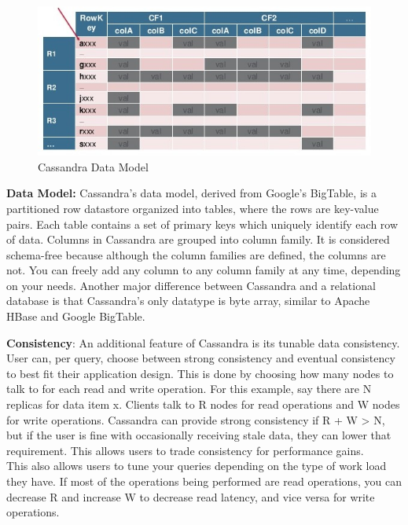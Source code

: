 \documentclass[9pt]{extarticle} %
\begin{document}
\begin{minipage}[t]{.61\linewidth}
\begin{figure}
\includegraphics[width=\linewidth]{imgs/data_model.jpg} 
\caption{Cassandra Data Model}\label{fig:2}
\end{figure} 

\textbf{Data Model:} Cassandra’s data model, derived from Google’s BigTable, is a partitioned row datastore organized into tables, where the rows are key-value pairs. Each table contains a set of primary keys which uniquely identify each row of data. Columns in Cassandra are grouped into column family. It is considered schema-free because although the column families are defined, the columns are not. You can freely add any column to any column family at any time, depending on your needs. Another major difference between Cassandra and a relational database is that Cassandra's only datatype is byte array, similar to Apache HBase and Google BigTable. 

\textbf{Consistency}: An additional feature of Cassandra is its tunable data consistency. User can, per query, choose between strong consistency and eventual consistency to best fit their application design. This is done by choosing how many nodes to talk to for each read and write operation. For this example, say there are N replicas for data item x. Clients talk to R nodes for read operations and W nodes for write operations. Cassandra can provide strong consistency if R + W > N, but if the user is fine with occasionally receiving stale data, they can lower that requirement. This allows users to trade consistency for performance gains. \\
This also allows users to tune your queries depending on the type of work load they have. If most of the operations being performed are read operations, you can decrease R and increase W to decrease read latency, and vice versa for write operations.

\end{minipage} %
\end{document}
